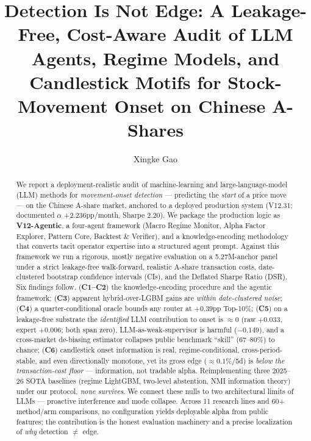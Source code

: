 \documentclass[sigconf,nonacm]{acmart}
\begin{document}
\title{Detection Is Not Edge: A Leakage-Free, Cost-Aware Audit of LLM Agents,
Regime Models, and Candlestick Motifs for Stock-Movement Onset on Chinese A-Shares}

\author{Xingke Gao}

\renewcommand{\shortauthors}{Gao}

\begin{abstract}
We report a deployment-realistic audit of machine-learning and large-language-model
(LLM) methods for \emph{movement-onset detection} --- predicting the \emph{start} of
a price move --- on the Chinese A-share market, anchored to a deployed production
system (V12.31; documented $\alpha$ $+2.236$pp/month, Sharpe $2.20$). We package the
production logic as \textbf{V12-Agentic}, a four-agent framework (Macro Regime
Monitor, Alpha Factor Explorer, Pattern Core, Backtest \& Verifier), and a
knowledge-encoding methodology that converts tacit operator expertise into a
structured agent prompt. Against this framework we run a rigorous, mostly negative
evaluation on a 5.27M-anchor panel under a strict leakage-free walk-forward,
realistic A-share transaction costs, date-clustered bootstrap confidence intervals
(CIs), and the Deflated Sharpe Ratio (DSR). Six findings follow. (\textbf{C1--C2})
the knowledge-encoding procedure and the agentic framework; (\textbf{C3}) apparent
hybrid-over-LGBM gains are \emph{within date-clustered noise}; (\textbf{C4}) a
quarter-conditional oracle bounds any router at $+0.39$pp Top-10\%; (\textbf{C5}) on
a leakage-free substrate the \emph{identified} LLM contribution to onset is
$\approx 0$ (raw $+0.033$, expert $+0.006$; both span zero), LLM-as-weak-supervisor
is harmful ($-0.149$), and a cross-market de-biasing estimator collapses public
benchmark ``skill'' (67--80\%) to chance; (\textbf{C6}) candlestick onset
information is real, regime-conditional, cross-period-stable, and even directionally
monotone, yet its gross edge ($\approx 0.1\%/$5d) is \emph{below the transaction-cost
floor} --- information, not tradable alpha. Reimplementing three 2025--26 SOTA
baselines (regime LightGBM, two-level abstention, NMI information theory) under our
protocol, \emph{none survives}. We connect these nulls to two architectural limits
of LLMs --- proactive interference and mode collapse. Across 11 research lines and
60+ method/arm comparisons, no configuration yields deployable alpha from public
features; the contribution is the honest evaluation machinery and a precise
localization of \emph{why} detection $\neq$ edge.
\end{abstract}
\end{document}
